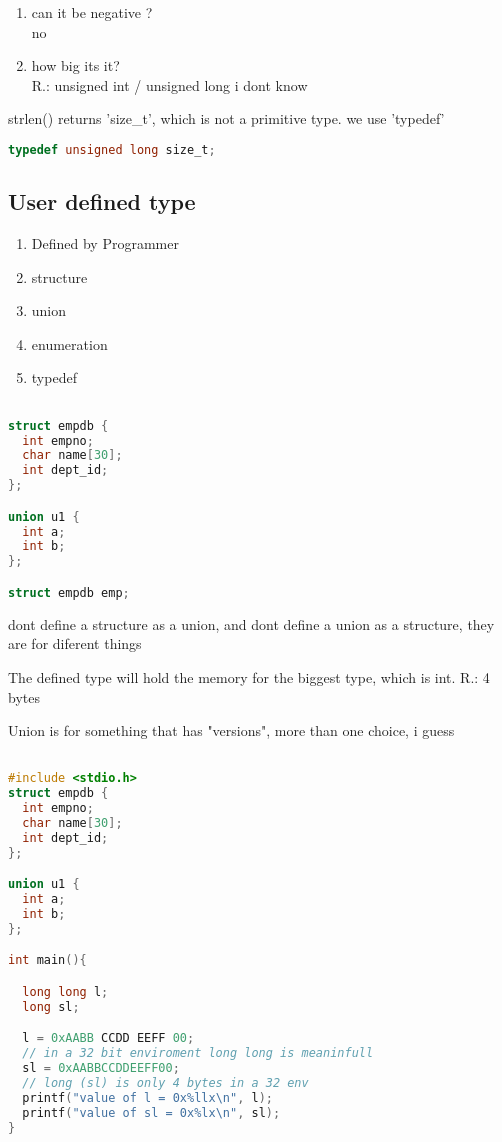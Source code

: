\documentclass[12pt]{article}
\begin{document}
\begin{enumerate}
	\begin{enumerate}
		\item can it be negative ?\\
			no
		\item how big its it?\\
			R.: unsigned int / unsigned long
			i dont know
	\end{enumerate}

	strlen() returns 'size\_t', which is not a primitive type.
	we use 'typedef'

	\begin{lstlisting}[language=C, title=defining size of an object]
		typedef unsigned long size_t;
\end{lstlisting}


\end{enumerate}

\subsection{User defined type}%
\label{sub:User defined type}

\begin{enumerate}
	\item Defined by Programmer
	\item structure
	\item union
	\item enumeration
	\item typedef

\end{enumerate}

\vspace{10mm}

\begin{lstlisting}[language=C, title=defined types]

struct empdb {
  int empno;
  char name[30];
  int dept_id;
};

union u1 {
  int a;
  int b;
};

struct empdb emp;
\end{lstlisting}


dont define a structure as a union, and dont define a union as a structure, they are for diferent things

The defined type will hold the memory for the biggest type, which is int. R.: 4 bytes

Union is for something that has "versions", more than one choice, i guess

\newpage

\begin{lstlisting}[language=C, title=code]

#include <stdio.h>
struct empdb {
  int empno;
  char name[30];
  int dept_id;
};

union u1 {
  int a;
  int b;
};

int main(){

  long long l;
  long sl;

  l = 0xAABB CCDD EEFF 00;
  // in a 32 bit enviroment long long is meaninfull
  sl = 0xAABBCCDDEEFF00;
  // long (sl) is only 4 bytes in a 32 env
  printf("value of l = 0x%llx\n", l);
  printf("value of sl = 0x%lx\n", sl);
}
\end{lstlisting}
\end{document}
